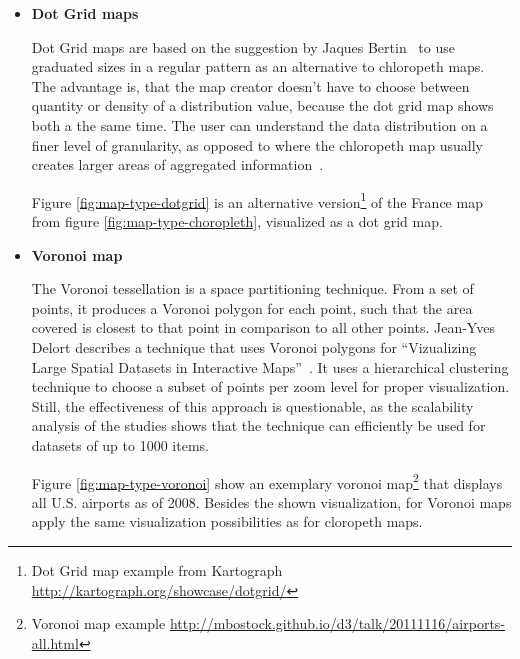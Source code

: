 \begin{itemize}
\item \textbf{Dot Grid maps}

Dot Grid maps are based on the suggestion by Jaques Bertin~\cite{bertin67graphics, bertin83graphics} to use graduated sizes in a regular pattern as an alternative to chloropeth maps. The advantage is, that the map creator doesn't have to choose between quantity or density of a distribution value, because the dot grid map shows both a the same time. The user can understand the data distribution on a finer level of granularity, as opposed to where the chloropeth map usually creates larger areas of aggregated information~\cite{web:dot-grid}.

Figure \ref{fig:map-type-dotgrid} is an alternative version\footnote{Dot Grid map example from Kartograph \url{http://kartograph.org/showcase/dotgrid/}} of the France map from figure \ref{fig:map-type-choropleth}, visualized as a dot grid map.


\item \textbf{Voronoi map}

The Voronoi tessellation is a space partitioning technique. From a set of points, it produces a Voronoi polygon for each point, such that the area covered is closest to that point in comparison to all other points. Jean-Yves Delort describes a technique that uses Voronoi polygons for ``Vizualizing Large Spatial Datasets in Interactive Maps''~\cite{Delort10vis}. It uses a hierarchical clustering technique to choose a subset of points per zoom level for proper visualization. Still, the effectiveness of this approach is questionable, as the scalability analysis of the studies shows that the technique can efficiently be used for datasets of up to 1000 items.

Figure \ref{fig:map-type-voronoi} show an exemplary voronoi map\footnote{Voronoi map example \url{http://mbostock.github.io/d3/talk/20111116/airports-all.html}} that displays all U.S. airports as of 2008. Besides the shown visualization, for Voronoi maps apply the same visualization possibilities as for cloropeth maps.


\end{itemize}
